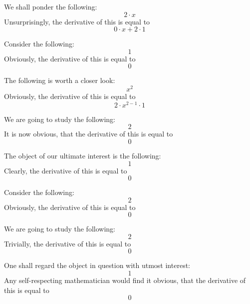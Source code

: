 \documentclass{article}
\begin{document}
We shall ponder the following:
\begin{equation}
2 \cdot x 
\end{equation}
Unsurprisingly, the derivative of this is equal to
\begin{equation}
0 \cdot x + 2 \cdot 1 
\end{equation}

Consider the following:
\begin{equation}
1 
\end{equation}
Obviously, the derivative of this is equal to
\begin{equation}
0 
\end{equation}

The following is worth a closer look:
\begin{equation}
x ^{2 } 
\end{equation}
Obviously, the derivative of this is equal to
\begin{equation}
2 \cdot x ^{2 - 1 } \cdot 1 
\end{equation}

We are going to study the following:
\begin{equation}
2 
\end{equation}
It is now obvious, that the derivative of this is equal to
\begin{equation}
0 
\end{equation}

The object of our ultimate interest is the following:
\begin{equation}
1 
\end{equation}
Clearly, the derivative of this is equal to
\begin{equation}
0 
\end{equation}

Consider the following:
\begin{equation}
2 
\end{equation}
Obviously, the derivative of this is equal to
\begin{equation}
0 
\end{equation}

We are going to study the following:
\begin{equation}
2 
\end{equation}
Trivially, the derivative of this is equal to
\begin{equation}
0 
\end{equation}

One shall regard the object in question with utmost interest:
\begin{equation}
1 
\end{equation}
Any self-respecting mathematician would find it obvious, that the derivative of this is equal to
\begin{equation}
0 
\end{equation}
\end{document}
